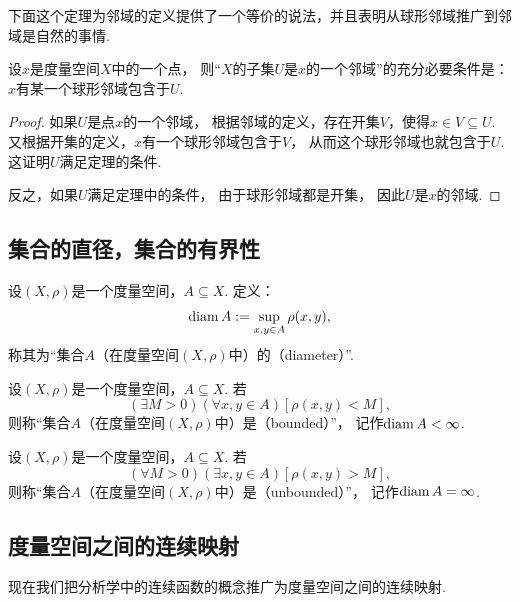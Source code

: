 下面这个定理为邻域的定义提供了一个等价的说法，并且表明从球形邻域推广到邻域是自然的事情.
\begin{theorem}\label{theorem:度量空间.邻域的判定}
设\(x\)是度量空间\(X\)中的一个点，
则“\(X\)的子集\(U\)是\(x\)的一个邻域”的充分必要条件是：
\(x\)有某一个球形邻域包含于\(U\).
\begin{proof}
如果\(U\)是点\(x\)的一个邻域，
根据邻域的定义，存在开集\(V\)，使得\(x \in V \subseteq U\).
又根据开集的定义，\(x\)有一个球形邻域包含于\(V\)，
从而这个球形邻域也就包含于\(U\).
这证明\(U\)满足定理的条件.

反之，如果\(U\)满足定理中的条件，
由于球形邻域都是开集，
因此\(U\)是\(x\)的邻域.
\end{proof}
\end{theorem}

\subsection{集合的直径，集合的有界性}
\begin{definition}
设\((X,\rho)\)是一个度量空间，\(A \subseteq X\).
定义：\begin{equation*}
	\operatorname{diam} A := \sup_{x,y \in A} \rho(x,y),
\end{equation*}
称其为“集合\(A\)（在度量空间\((X,\rho)\)中）的（diameter）”.
\end{definition}
\begin{definition}
设\((X,\rho)\)是一个度量空间，\(A \subseteq X\).
若\begin{equation*}
	(\exists M>0)
	(\forall x,y \in A)
	[\rho(x,y) < M],
\end{equation*}
则称“集合\(A\)（在度量空间\((X,\rho)\)中）是（bounded）”，
记作\(\operatorname{diam} A < \infty\).
\end{definition}
\begin{definition}
设\((X,\rho)\)是一个度量空间，\(A \subseteq X\).
若\begin{equation*}
	(\forall M>0)
	(\exists x,y \in A)
	[\rho(x,y) > M],
\end{equation*}
则称“集合\(A\)（在度量空间\((X,\rho)\)中）是（unbounded）”，
记作\(\operatorname{diam} A = \infty\).
\end{definition}

\subsection{度量空间之间的连续映射}
现在我们把分析学中的连续函数的概念推广为度量空间之间的连续映射.

